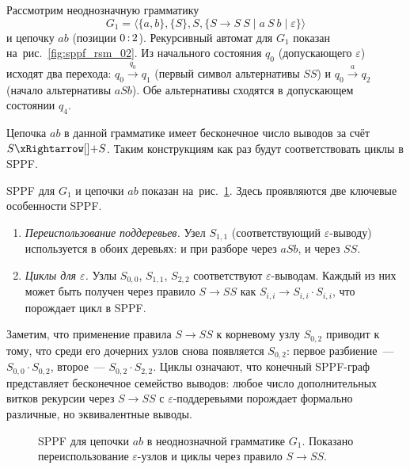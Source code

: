 \begin{example}
	\label{exmpl:sppf_ambiguous}
	Рассмотрим неоднозначную грамматику
	\[
	G_1 = \langle \{a,b\}, \{S\}, S, \{S \to S \ S \mid a \ S \ b \mid \varepsilon\} \rangle
	\]
	и цепочку $ab$ (позиции $0 \rng 2$).
	Рекурсивный автомат для $G_1$ показан на~рис.~\ref{fig:sppf_rsm_02}.
	Из начального состояния $q_0$ (допускающего $\varepsilon$) исходят два перехода: $q_0 \xrightarrow{q_0} q_1$ (первый символ альтернативы $SS$) и $q_0 \xrightarrow{a} q_2$ (начало альтернативы $aSb$).
	Обе альтернативы сходятся в допускающем состоянии $q_4$.

	\begin{marginfigure}
		\begin{center}
			\resizebox{\marginparwidth}{!}{}
		\end{center}
		\caption{Рекурсивный автомат для грамматики $G_1$: $S \to SS \mid aSb \mid \varepsilon$.}
		\label{fig:sppf_rsm_02}
	\end{marginfigure}

	Цепочка $ab$ в данной грамматике имеет бесконечное число выводов за счёт $S \derives[+] S$. Таким конструкциям как раз будут соответствовать циклы в SPPF.

	SPPF для $G_1$ и цепочки $ab$ показан на~рис.~\ref{fig:sppf_02}.
	Здесь проявляются две ключевые особенности SPPF.
	\begin{enumerate}
		\item \emph{Переиспользование поддеревьев.} Узел $S_{1,1}$ (соответствующий $\varepsilon$-выводу) используется в обоих деревьях: и при разборе через $aSb$, и через $SS$.
		\item \emph{Циклы для $\varepsilon$.} Узлы $S_{0,0}$, $S_{1,1}$, $S_{2,2}$ соответствуют $\varepsilon$-выводам. Каждый из них может быть получен через правило $S \to SS$ как $S_{i,i} \to S_{i,i} \cdot S_{i,i}$, что порождает цикл в SPPF.
	\end{enumerate}
	Заметим, что применение правила $S \to SS$ к корневому узлу $S_{0,2}$ приводит к тому, что среди его дочерних узлов снова появляется $S_{0,2}$: первое разбиение~--- $S_{0,0} \cdot S_{0,2}$, второе~--- $S_{0,2} \cdot S_{2,2}$.
	Циклы означают, что конечный SPPF-граф представляет бесконечное семейство выводов: любое число дополнительных витков рекурсии через $S \to SS$ с $\varepsilon$-поддеревьями порождает формально различные, но эквивалентные выводы.

	\begin{figure}[H]
		\begin{center}
			\resizebox{0.95\textwidth}{!}{}
		\end{center}
		\caption{SPPF для цепочки $ab$ в неоднозначной грамматике $G_1$. Показано переиспользование $\varepsilon$-узлов и циклы через правило $S \to SS$.}
		\label{fig:sppf_02}
	\end{figure}
\end{example}

